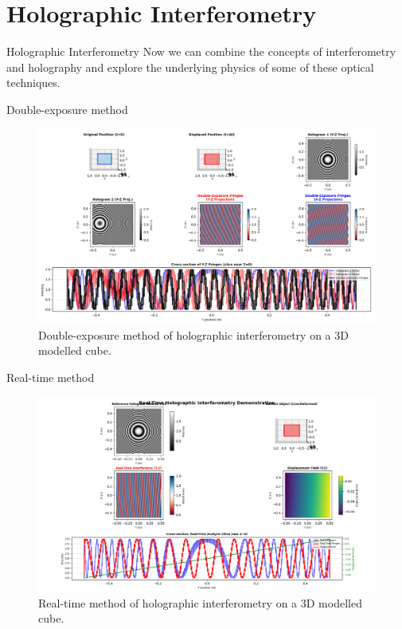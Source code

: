 \documentclass{beamer}
\begin{document}
\section{Holographic Interferometry}
\begin{frame}{Holographic Interferometry}
    Now we can combine the concepts of interferometry and holography and explore the underlying physics of some of these optical techniques.
\end{frame}
\begin{frame}{Double-exposure method}
    \begin{figure}[h]
        \centering
        \includegraphics[width=1\textwidth]{Figures/cube-double-exposure.png}
        \caption{Double-exposure method of holographic interferometry on a 3D modelled cube.}
        \label{fig:double_exposure_holography}
    \end{figure}
\end{frame}
\begin{frame}{Real-time method}
    \begin{figure}[h]
        \centering
        \includegraphics[width=1\textwidth]{Figures/real-time-cube.png}
        \caption{Real-time method of holographic interferometry on a 3D modelled cube.}
        \label{fig:realtime_holography}
    \end{figure}
\end{frame}
\end{document}
